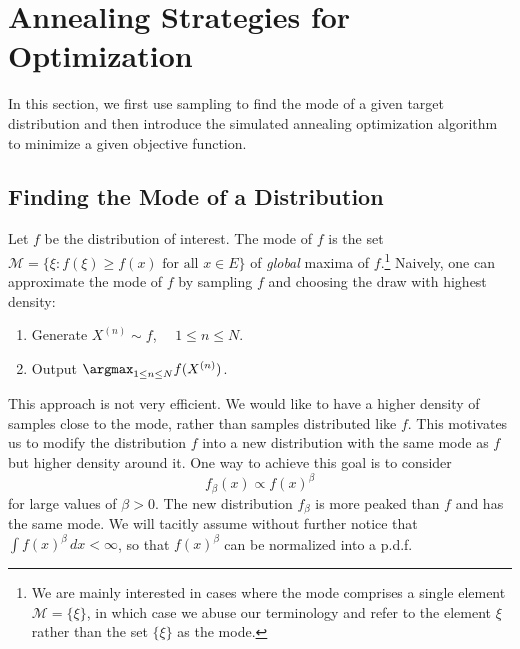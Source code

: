 
\section{Annealing Strategies for Optimization}
\label{sec:7.1}

In this section, we first use sampling to find the mode of a given target distribution and then
introduce the simulated annealing optimization algorithm to minimize a given objective function.

\subsection{Finding the Mode of a Distribution}
\label{sec:7.1.1}

Let $f$ be the distribution of interest. The mode of $f$ is the set
$\mathcal{M} = \{\xi : f(\xi) \geq f(x) \text{ for all } x \in E\}$
of \textit{global} maxima of $f$.\footnote{We are mainly interested in cases where the mode
comprises a single element $\mathcal{M} = \{\xi\}$, in which case we abuse our terminology and
refer to the element $\xi$ rather than the set $\{\xi\}$ as the mode.}
Naively, one can approximate the mode of $f$ by sampling $f$ and choosing the draw with highest
density:

\begin{enumerate}[label=\arabic*:]
\item Generate $X^{(n)} \sim f$, $\quad 1 \leq n \leq N$.
\item Output $\argmax_{1 \leq n \leq N} f(X^{(n)})$.
\end{enumerate}

This approach is not very efficient. We would like to have a higher density of samples close
to the mode, rather than samples distributed like $f$. This motivates us to modify the
distribution $f$ into a new distribution with the same mode as $f$ but higher density around it.
One way to achieve this goal is to consider
\begin{equation}
  f_\beta(x) \propto f(x)^\beta
  \label{eq:7.1}
\end{equation}
for large values of $\beta > 0$. The new distribution $f_\beta$ is more peaked than $f$ and has
the same mode. We will tacitly assume without further notice that $\int f(x)^\beta\, dx < \infty$,
so that $f(x)^\beta$ can be normalized into a p.d.f.

